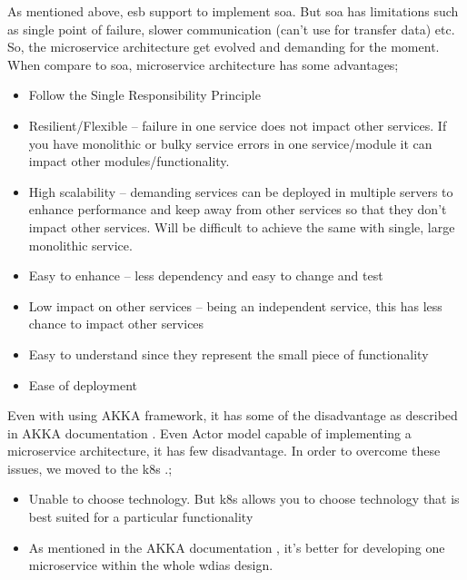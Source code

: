 As mentioned above, \acrshort{esb} support to implement \acrshort{soa}. But \acrshort{soa} has limitations such as single point of failure, slower communication (can’t use for transfer data) etc. So, the microservice architecture get evolved and demanding for the moment. When compare to \acrshort{soa}, microservice architecture has some advantages;
\begin{itemize}
    \item Follow the Single Responsibility Principle
    \item Resilient/Flexible – failure in one service does not impact other services. If you have monolithic or bulky service errors in one service/module it can impact other modules/functionality.
    \item High scalability – demanding services can be deployed in multiple servers to enhance performance and keep away from other services so that they don’t impact other services. Will be difficult to achieve the same with single, large monolithic service.
    \item Easy to enhance – less dependency and easy to change and test
    \item Low impact on other services – being an independent service, this has less chance to impact other services
    \item Easy to understand since they represent the small piece of functionality
    \item Ease of deployment
\end{itemize}

Even with using AKKA framework, it has some of the disadvantage as described in AKKA documentation \cite{Akka.ioWhenCluster}. Even Actor model capable of implementing a microservice architecture, it has few disadvantage. In order to overcome these issues, we moved to the \acrfull{k8s} \cite{LinuxFoundationProduction-GradeKubernetes}.;
\begin{itemize}
    \item Unable to choose technology. But \acrshort{k8s} allows you to choose technology that is best suited for a particular functionality
    \item As mentioned in the AKKA documentation \cite{Akka.ioWhenCluster}, it's better for developing one microservice within the whole \acrshort{wdias} design.
\end{itemize}
